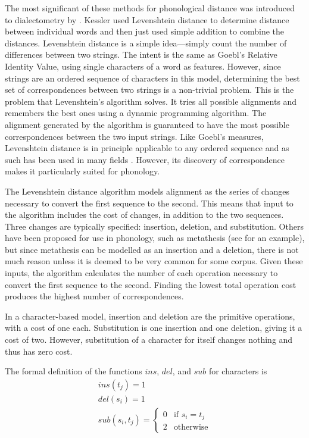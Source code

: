 \documentclass[11pt]{article}
\begin{document}
The most significant of these methods for phonological distance was
introduced to dialectometry by . Kessler used
Levenshtein distance \cite{lev65} to determine distance between
individual words and then just used simple addition to combine the
distances.  Levenshtein distance is a simple idea---simply count the
number of differences between two strings. The intent is the same as
Goebl's Relative Identity Value, using single characters of a word as
features. However, since strings are an ordered sequence of characters
in this model, determining the best set of correspondences between two
strings is a non-trivial problem. This is the problem that
Levenshtein's algorithm solves. It tries all possible alignments and
remembers the best ones using a dynamic programming algorithm. The
alignment generated by the algorithm is guaranteed to have the most
possible correspondences between the two input strings. Like Goebl's
measures, Levenshtein distance is in principle applicable to any
ordered sequence and as such has been used in many fields
\cite{sankoff83}. However, its discovery of correspondence makes it
particularly suited for phonology.

The Levenshtein distance algorithm models alignment
as the series of changes necessary to convert the first sequence to
the second. This means that input to the algorithm includes the cost
of changes, in addition to the two sequences. Three changes are
typically specified: insertion, deletion, and substitution. Others have
been proposed for use in phonology,
such as metathesis (see \cite{kondrak02} for an
example), but since metathesis can be modelled as an insertion and a
deletion, there is not much reason unless it is deemed to be very
common for some corpus.
Given these inputs, the algorithm calculates the number of each
operation necessary to convert the first sequence to the
second. Finding the lowest total operation cost produces the highest number of
correspondences.

In a character-based model, insertion and deletion are the primitive operations,
with a cost of one each. Substitution is one insertion and one
deletion, giving it a cost of two. However, substitution of a character
for itself changes nothing and thus has zero cost.

The formal definition of the functions $ins$, $del$, and $sub$
for characters is
\[ \begin{array}{l}
   ins(t_j) = 1 \\
   del(s_i) = 1 \\
   sub(s_i,t_j) = \left\{
     \begin{array}{ll}
       0 & \textrm{if $s_i=t_j$} \\
       2 & \textrm{otherwise}
     \end{array} \right.

   \end{array}
\]
\end{document}

